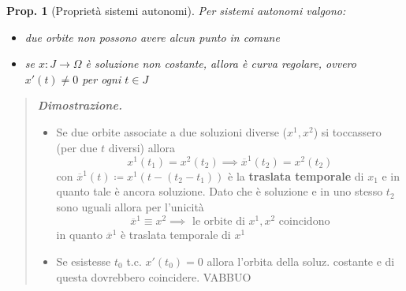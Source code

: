 \documentclass[a4paper,10pt]{article}
\theoremstyle{indentdefinition}
\theoremstyle{indenttheorem}
\newtheorem{prop}{Prop.}
\theoremstyle{myremark}
\theoremstyle{indentgeneral}
\newenvironment{dimo}{\begin{quote}\textit{\textbf{Dimostrazione.}}}{\end{quote}} %
\begin{document}
\begin{prop}[Proprietà sistemi autonomi]
Per sistemi autonomi valgono:
\begin{itemize}
    \item[a)] due orbite non possono avere alcun punto in comune 
    \item[b)] se $x:J\to\Omega$ è soluzione non costante, allora è curva regolare, ovvero $x'(t)\ne 0$ per ogni $t\in J$
\end{itemize}
\end{prop}
\begin{dimo}
    \begin{itemize}
       \item[a)] Se due orbite associate a due soluzioni diverse ($x^1,x^2$) si toccassero (per due  $t$ diversi) allora 
       $$x^1(t_1)=x^2(t_2) \implies \overline{x}^1(t_2)=x^2(t_2)$$
       con $\overline{x}^1(t)\coloneqq x^1(t-(t_2-t_1))$ è la \textbf{traslata temporale} di $x_1$ e in quanto tale è ancora soluzione. Dato che è soluzione e in uno stesso $t_2$ sono uguali allora per l'unicità $$ \overline{x}^1\equiv x^2\implies \text{ le orbite di $x^1,x^2$ coincidono}$$
       in quanto $\overline{x}^1$ è traslata temporale di $x^1$
       
    \item[b)] Se esistesse $t_0$ t.c. $x'(t_0)=0$ allora l'orbita della soluz. costante e di questa dovrebbero coincidere. VABBUO
    \end{itemize}
\end{dimo}
    
\end{document}
